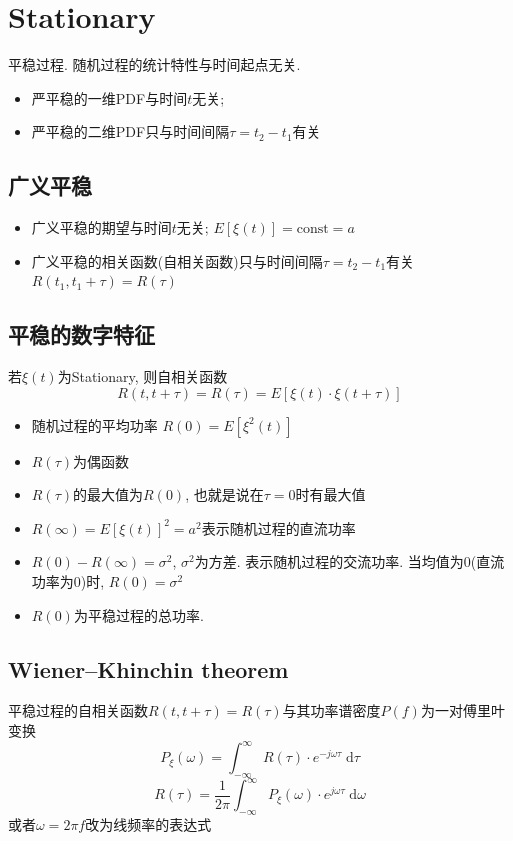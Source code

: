 \documentclass[a4paper]{report}
\begin{document}
\section{Stationary}
平稳过程. 随机过程的统计特性与时间起点无关. 
\begin{itemize}
  \item 严平稳的一维PDF与时间$t$无关; 
  \item 严平稳的二维PDF只与时间间隔$\tau=t_2-t_1$有关
\end{itemize}
\subsection{广义平稳}
\begin{itemize}
  \item 广义平稳的期望与时间$t$无关; $E[\xi(t)]=\text{const}=a$
  \item 广义平稳的相关函数(自相关函数)只与时间间隔$\tau=t_2-t_1$有关 $R(t_1,t_1+\tau)=R(\tau)$
\end{itemize}
\subsection{平稳的数字特征}
若$\xi(t)$为Stationary, 则自相关函数$$R(t,t+\tau)=R(\tau)=E[\xi(t)\cdot\xi(t+\tau)]$$
\begin{itemize}
  \item 随机过程的平均功率 $R(0)=E[\xi^2(t)]$
  \item $R(\tau)$为偶函数
  \item $R(\tau)$的最大值为$R(0)$, 也就是说在$\tau=0$时有最大值
  \item $R(\infty)=E[\xi(t)]^2=a^2$表示随机过程的直流功率
  \item $R(0)-R(\infty)=\sigma^2$, $\sigma^2$为方差. 表示随机过程的交流功率. 当均值为0(直流功率为0)时, $R(0)=\sigma^2$
  \item $R(0)$为平稳过程的总功率. 
\end{itemize}
\subsection{Wiener–Khinchin theorem}
平稳过程的自相关函数$R(t,t+\tau)=R(\tau)$与其功率谱密度$P(f)$为一对傅里叶变换
\begin{equation}
  P_\xi(\omega)=\int_{-\infty}^\infty R(\tau)\cdot e^{-j\omega\tau}\;\text{d}\tau 
\end{equation}
\begin{equation}
  R(\tau)=\frac{1}{2\pi}\int_{-\infty}^\infty P_\xi(\omega)\cdot e^{j\omega\tau}\;\text{d}\omega 
\end{equation}
或者$\omega=2\pi f$改为线频率的表达式
\end{document}
